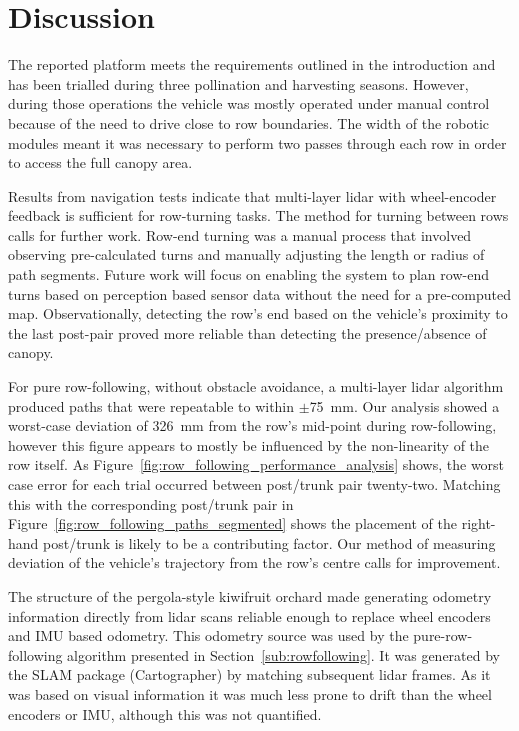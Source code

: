 \documentclass[preprint,authoryear,12pt]{elsarticle}
\begin{document}
\section{Discussion}
\label{sect:discussion}

    The reported platform meets the requirements outlined in the introduction and has been trialled during three pollination and harvesting seasons.
    However, during those operations the vehicle was mostly operated under manual control because of the need to drive close to row boundaries.
    The width of the robotic modules meant it was necessary to perform two passes through each row in order to access the full canopy area.

    Results from navigation tests indicate that multi-layer lidar with wheel-encoder feedback is sufficient for row-turning tasks.
    The method for turning between rows calls for further work.
    Row-end turning was a manual process that involved observing pre-calculated turns and manually adjusting the length or radius of path segments.
    Future work will focus on enabling the system to plan row-end turns based on perception based sensor data without the need for a pre-computed map.
    Observationally, detecting the row's end based on the vehicle's proximity to the last post-pair proved more reliable than detecting the presence/absence of canopy.

    For pure row-following, without obstacle avoidance, a multi-layer lidar algorithm produced paths that were repeatable to within $\pm$\SI{75}{\milli\meter}.
    Our analysis showed a worst-case deviation of \SI{326}{\milli\meter} from the row's mid-point during row-following, however this figure appears to mostly be influenced by the non-linearity of the row itself.
    As Figure~\ref{fig:row_following_performance_analysis} shows, the worst case error for each trial occurred between post/trunk pair twenty-two.
    Matching this with the corresponding post/trunk pair in Figure~\ref{fig:row_following_paths_segmented} shows the placement of the right-hand post/trunk is likely to be a contributing factor.
    Our method of measuring deviation of the vehicle's trajectory from the row's centre calls for improvement.

    The structure of the pergola-style kiwifruit orchard made generating odometry information directly from lidar scans reliable enough to replace wheel encoders and IMU based odometry.
    This odometry source was used by the pure-row-following algorithm presented in Section~\ref{sub:rowfollowing}.
    It was generated by the SLAM package (Cartographer) by matching subsequent lidar frames.
    As it was based on visual information it was much less prone to drift than the wheel encoders or IMU, although this was not quantified.
\end{document}
